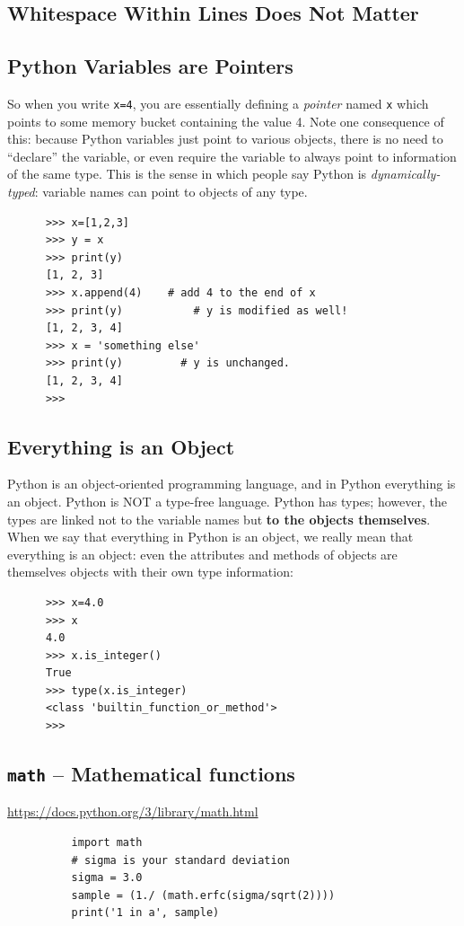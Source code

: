 \documentclass[11pt,a4paper]{article}
\begin{document}
    \subsection*{Whitespace Within Lines Does Not Matter}

    \subsection*{Python Variables are Pointers}
    So when you write {\tt x=4}, you are essentially defining a {\it pointer} named {\tt x} which points to some memory bucket containing the value 4. Note one consequence of this: because Python variables just point to various objects, there is no need to ``declare'' the variable, or even require the variable to always point to information of the same type.  This is the sense in which people say Python is {\it dynamically-typed}: variable names can point to objects of any type.
    \begin{lstlisting}
      >>> x=[1,2,3]
      >>> y = x
      >>> print(y)
      [1, 2, 3]
      >>> x.append(4)    # add 4 to the end of x
      >>> print(y)           # y is modified as well!
      [1, 2, 3, 4]
      >>> x = 'something else'
      >>> print(y)         # y is unchanged. 
      [1, 2, 3, 4]
      >>> 
    \end{lstlisting}


    \subsection*{Everything is an Object}
    Python is an object-oriented programming language, and in Python
    everything is an object. Python is NOT a type-free language. Python
    has types; however, the types are linked not to the variable names but
    {\bf to the objects themselves}. When we say that everything in Python
    is an object, we really mean that everything is an object: even the
    attributes and methods of objects are themselves objects with their
    own type information:
    \begin{lstlisting}
      >>> x=4.0
      >>> x
      4.0
      >>> x.is_integer()
      True
      >>> type(x.is_integer)
      <class 'builtin_function_or_method'>
      >>> 
    \end{lstlisting}

    \subsection{{\tt math} -- Mathematical functions}
    \href{https://docs.python.org/3/library/math.html}{https://docs.python.org/3/library/math.html}\\
        \begin{lstlisting}
          import math
          # sigma is your standard deviation
          sigma = 3.0
          sample = (1./ (math.erfc(sigma/sqrt(2))))
          print('1 in a', sample)
        \end{lstlisting}
\end{document}

